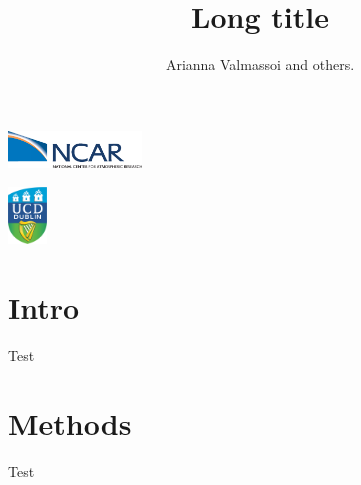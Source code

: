\documentclass[compress,12pt,xcolor=dvipsnames]{beamer}
\title[Short title]{Long title}
\author[A.Valmassoi]{Arianna Valmassoi and others.}
\institute{Schools}
\begin{document}
\begin{frame}
\begin{flushleft}
\includegraphics[height=1cm]{ncar-logo.eps}
\end{flushleft}
\vspace{-5mm}
\maketitle
\vspace{-22mm}
\begin{flushright}
\includegraphics[height=1.5cm]{logo.png}
\end{flushright}

\end{frame}


\begin{frame} 
 \tableofcontents
 \end{frame}
\section{Intro}
\begin{frame} 
 Test
 \end{frame}
\section{Methods}
\begin{frame} 
Test
\end{frame}
\end{document}
